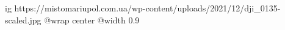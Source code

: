  
 
 
 
 

\ifcmt
  ig https://mistomariupol.com.ua/wp-content/uploads/2021/12/dji_0135-scaled.jpg
  @wrap center
  @width 0.9
\fi
